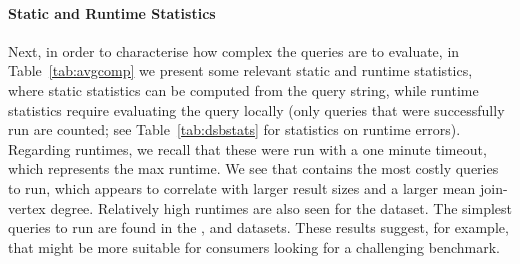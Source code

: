 \paragraph{Static and Runtime Statistics} Next, in order to characterise how complex the queries are to evaluate, in Table~\ref{tab:avgcomp} we present some relevant static and runtime statistics, where static statistics can be computed from the query string, while runtime statistics require evaluating the query locally (only queries that were successfully run are counted; see Table~\ref{tab:dsbstats} for statistics on runtime errors). Regarding runtimes, we recall that these were run with a one minute timeout, which represents the max runtime.
We see that \linkedgeodata contains the most costly queries to run, which appears to correlate with larger result sizes and a larger mean join-vertex degree. Relatively high runtimes are also seen for the \kegg dataset. The simplest queries to run are found in the \genage, \gendr and \taxonomy datasets. These results suggest, for example, that \linkedgeodata might be more suitable for consumers looking for a challenging benchmark.


